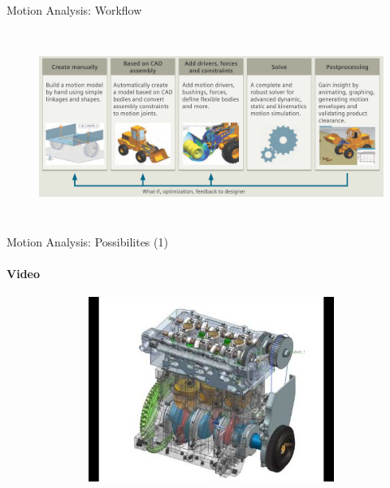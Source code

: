 \documentclass[aspectratio=169]{beamer}
\begin{document}
\begin{frame}[t]{Motion Analysis: Workflow}
\framesubtitle{}
    \vspace{-0.6cm}
    \begin{figure}[H]
        \centering\includegraphics[height=6cm,width=1\textwidth,keepaspectratio]{cae_motion_guideline.png}
        \label{fig:cae_motion_guideline.png}
    \end{figure}
\end{frame}

\begin{frame}[t]{Motion Analysis: Possibilites (1)}
    \framesubtitle{Video}
    \vspace{-0.6cm}
    \begin{figure}[H]
        \href{https://www.youtube.com/watch?v=biMRRdMpJno}{
            \centering\includegraphics[height=6cm,width=1\textwidth,keepaspectratio]{motion_video1_preview.jpg}}
        \label{fig:motion_video1_preview.jpg}
    \end{figure}
\end{frame}
\end{document}

